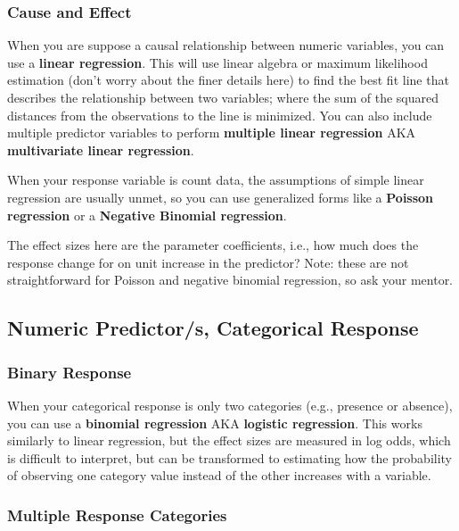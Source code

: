 \documentclass[
  letterpaper,
  DIV=11,
  numbers=noendperiod]{scrreprt}
\begin{document}
\subsubsection{Cause and Effect}\label{sec-reg}

When you are suppose a causal relationship between numeric variables,
you can use a \textbf{linear regression}. This will use linear algebra
or maximum likelihood estimation (don't worry about the finer details
here) to find the best fit line that describes the relationship between
two variables; where the sum of the squared distances from the
observations to the line is minimized. You can also include multiple
predictor variables to perform \textbf{multiple linear regression} AKA
\textbf{multivariate linear regression}.

When your response variable is count data, the assumptions of simple
linear regression are usually unmet, so you can use generalized forms
like a \textbf{Poisson regression} or a \textbf{Negative Binomial
regression}.

The effect sizes here are the parameter coefficients, i.e., how much
does the response change for on unit increase in the predictor? Note:
these are not straightforward for Poisson and negative binomial
regression, so ask your mentor.

\subsection{Numeric Predictor/s, Categorical
Response}\label{numeric-predictors-categorical-response}

\subsubsection{Binary Response}\label{sec-bin}

When your categorical response is only two categories (e.g., presence or
absence), you can use a \textbf{binomial regression} AKA
\textbf{logistic regression}. This works similarly to linear regression,
but the effect sizes are measured in log odds, which is difficult to
interpret, but can be transformed to estimating how the probability of
observing one category value instead of the other increases with a
variable.

\subsubsection{Multiple Response
Categories}\label{multiple-response-categories}
\end{document}
